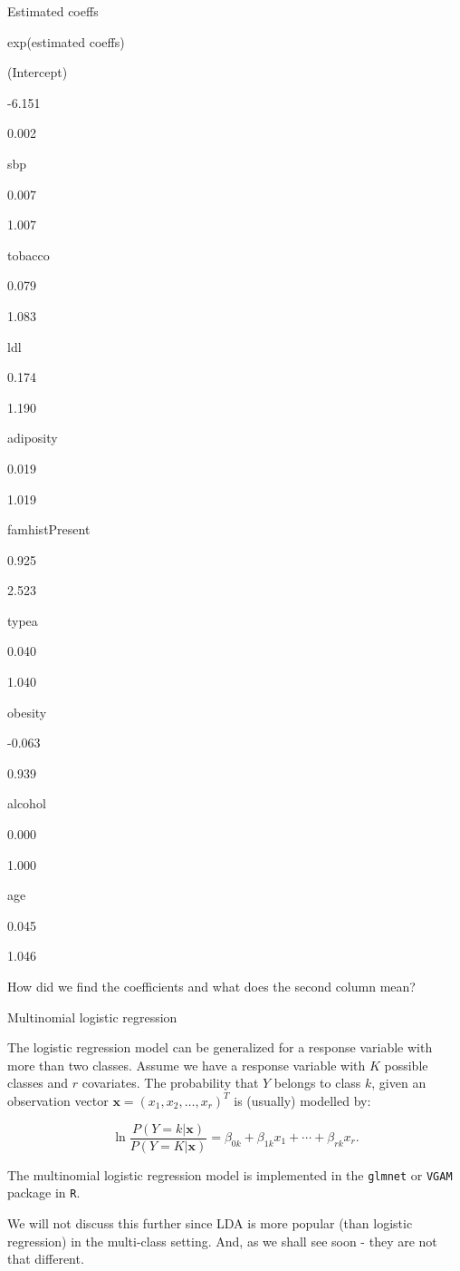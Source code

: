 \documentclass[10pt,ignorenonframetext,]{beamer}
\begin{document}
\begin{frame}

Estimated coeffs

exp(estimated coeffs)

(Intercept)

-6.151

0.002

sbp

0.007

1.007

tobacco

0.079

1.083

ldl

0.174

1.190

adiposity

0.019

1.019

famhistPresent

0.925

2.523

typea

0.040

1.040

obesity

-0.063

0.939

alcohol

0.000

1.000

age

0.045

1.046

How did we find the coefficients and what does the second column mean?

\end{frame}

\begin{frame}[fragile]

\begin{block}{Multinomial logistic regression}

The logistic regression model can be generalized for a response variable
with more than two classes. Assume we have a response variable with
\(K\) possible classes and \(r\) covariates. The probability that \(Y\)
belongs to class \(k\), given an observation vector
\(\mathbf{x} = (x_1, x_2, \dots, x_r)^T\) is (usually) modelled by:

\[\ln \frac{P(Y = k | \mathbf{x})}{P(Y = K | \mathbf{x})}= \beta_{0k} + \beta_{1k} x_1 + \cdots + \beta_{rk} x_r.\]

The multinomial logistic regression model is implemented in the
\texttt{glmnet} or \texttt{VGAM} package in \texttt{R}.

We will not discuss this further since LDA is more popular (than
logistic regression) in the multi-class setting. And, as we shall see
soon - they are not that different.

\end{block}

\end{frame}
\end{document}
